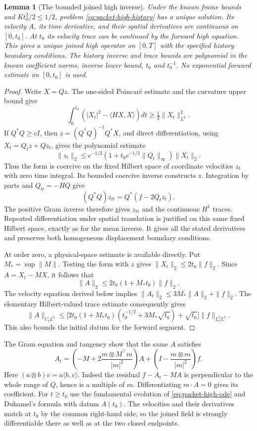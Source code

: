 \documentclass[11pt]{article}
\newtheorem{lemma}[theorem]{Lemma}
\theoremstyle{definition}
\begin{document}
\begin{lemma}[The bounded joined high inverse]\label{lem:packet-joined-high}
Under the known frame bounds and $Kt_0^2/2\le1/2$, problem
\eqref{eq:packet-high-history} has a unique solution. Its velocity $A$,
its time derivative, and their spatial derivatives are continuous on
$[0,t_0]$. At $t_0$ its velocity trace can be continued by the
forward high equation. This gives a unique joined high operator on
$[0,T]$ with the specified history boundary conditions. The history
inverse and trace bounds are polynomial in the known coefficient norms,
inverse lower bound, $t_0$ and $t_0^{-1}$. No exponential forward
estimate on $[0,t_0]$ is used.
\end{lemma}
\begin{proof}
Write $X=Qz$. The one-sided Poincar\'e estimate and the curvature upper
bound give
\[
 \int_0^{t_0}(|X_t|^2-\langle HX,X\rangle)dt
       \ge\tfrac12\|X_t\|_{L^2}^2.
\]
If $Q^*Q\ge cI$, then $z=(Q^*Q)^{-1}Q^*X$, and direct differentiation,
using $X_t=Q_tz+Qz_t$, gives the polynomial estimate
\[
 \|z_t\|_2\le
 c^{-1/2}(1+t_0 c^{-1/2}\|Q_t\|_\infty)\|X_t\|_2.
\]
Thus the form is coercive on the fixed Hilbert space of coordinate
velocities $z_t$ with zero time integral. Its bounded coercive inverse
constructs $z$. Integration by parts and $Q_{tt}=-HQ$ give
\[
 (Q^*Q)z_{tt}=Q^*(f-2Q_tz_t).
\]
The positive Gram inverse therefore gives $z_{tt}$ and the
continuous $H^1$ traces. Repeated differentiation under spatial
translation is justified on this same fixed Hilbert space, exactly as
for the mean inverse. It gives all the stated derivatives and preserves
both homogeneous displacement boundary conditions.

At order zero, a physical-space estimate is available directly.
Put $M_* =\sup\|M\|$. Testing the form with $z$
gives $\|X_t\|_2\le2t_0\|f\|_2$. Since $A=X_t-MX$, it follows that
\[
 \|A\|_2\le2t_0(1+M_*t_0)\|f\|_2.
\]
The velocity equation derived below implies
$\|A_t\|_2\le3M_*\|A\|_2+\|f\|_2$. The elementary Hilbert-valued
trace estimate consequently gives
\begin{equation}\label{eq:packet-history-polynomial-trace}
 \|A\|_{C_tL^2}\le
 \bigl[2t_0(1+M_*t_0)(t_0^{-1/2}+3M_*\sqrt{t_0})
                         +\sqrt{t_0}\bigr]\|f\|_{L^2_tL^2}.
\end{equation}
This also bounds the initial datum for the forward segment.
\end{proof}

The Gram equation and tangency show that the same $A$ satisfies
\begin{equation}\label{eq:packet-high-ode}
 A_t=\left(-M+2\frac{m\otimes M^{\top}m}{|m|^2}\right)A
       +\left(I-\frac{m\otimes m}{|m|^2}\right)f.
\end{equation}
Here $(a\otimes b)v=a\langle b,v\rangle$. Indeed the residual
$f-A_t-MA$ is perpendicular to the whole range of $Q$, hence is a
multiple of $m$. Differentiating $m\cdot A=0$ gives its coefficient.
For $t\ge t_0$ use the fundamental evolution of
\eqref{eq:packet-high-ode} and Duhamel's formula with datum $A(t_0)$.
The velocities and their derivatives match at $t_0$ by the common
right-hand side, so the joined field is strongly differentiable there
as well as at the two closed endpoints.
\end{document}
